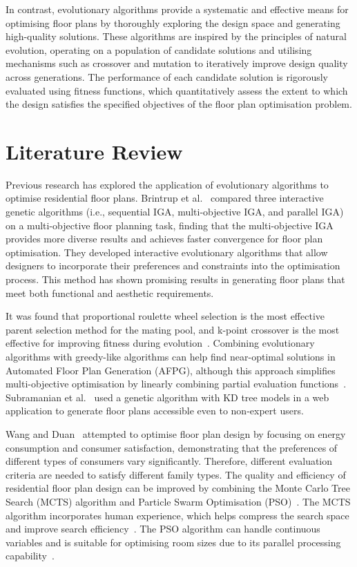\documentclass[]{article}
\begin{document}
In contrast, evolutionary algorithms provide a systematic and effective means for optimising floor plans by thoroughly exploring the design space and generating high-quality solutions. These algorithms are inspired by the principles of natural evolution, operating on a population of candidate solutions and utilising mechanisms such as crossover and mutation to iteratively improve design quality across generations. The performance of each candidate solution is rigorously evaluated using fitness functions, which quantitatively assess the extent to which the design satisfies the specified objectives of the floor plan optimisation problem.

\section{Literature Review}
Previous research has explored the application of evolutionary algorithms to optimise residential floor plans. Brintrup et al.~\cite{10.1007/11732242_56} compared three interactive genetic algorithms (i.e., sequential IGA, multi-objective IGA, and parallel IGA) on a multi-objective floor planning task, finding that the multi-objective IGA provides more diverse results and achieves faster convergence for floor plan optimisation. They developed interactive evolutionary algorithms that allow designers to incorporate their preferences and constraints into the optimisation process. This method has shown promising results in generating floor plans that meet both functional and aesthetic requirements.

It was found that proportional roulette wheel selection is the most effective parent selection method for the mating pool, and k-point crossover is the most effective for improving fitness during evolution~\cite{7844659}. Combining evolutionary algorithms with greedy-like algorithms can help find near-optimal solutions in Automated Floor Plan Generation (AFPG), although this approach simplifies multi-objective optimisation by linearly combining partial evaluation functions~\cite{doi:10.1177/1478077119832982}. Subramanian et al.~\cite{9675541} used a genetic algorithm with KD tree models in a web application to generate floor plans accessible even to non-expert users.

Wang and Duan~\cite{WANG2023100238} attempted to optimise floor plan design by focusing on energy consumption and consumer satisfaction, demonstrating that the preferences of different types of consumers vary significantly. Therefore, different evaluation criteria are needed to satisfy different family types. The quality and efficiency of residential floor plan design can be improved by combining the Monte Carlo Tree Search (MCTS) algorithm and Particle Swarm Optimisation (PSO)~\cite{YAN2024110546}. The MCTS algorithm incorporates human experience, which helps compress the search space and improve search efficiency~\cite{YAN2024110546}. The PSO algorithm can handle continuous variables and is suitable for optimising room sizes due to its parallel processing capability~\cite{YAN2024110546}.
\end{document}
